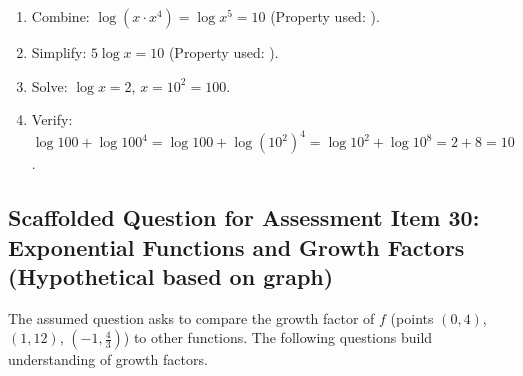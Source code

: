 \documentclass[12pt]{article}
\begin{document}
\begin{enumerate}[label=24.\arabic*]
    \begin{enumerate}[label=\alph*)]
        \item Combine: \( \log(x \cdot x^4) = \log x^5 = 10 \) (Property used: \underline{\hspace{2cm}}).
        \item Simplify: \( 5 \log x = 10 \) (Property used: \underline{\hspace{2cm}}).
        \item Solve: \( \log x = 2 \), \( x = 10^2 = 100 \).
        \item Verify: \( \log 100 + \log 100^4 = \log 100 + \log (10^2)^4 = \log 10^2 + \log 10^8 = 2 + 8 = 10 \).
    \end{enumerate}
\end{enumerate}

\subsection*{Scaffolded Question for Assessment Item 30: Exponential Functions and Growth Factors (Hypothetical based on graph)}
The assumed question asks to compare the growth factor of \( f \) (points \((0, 4)\), \((1, 12)\), \((-1, \frac{4}{3})\)) to other functions. The following questions build understanding of growth factors.
\end{document}
